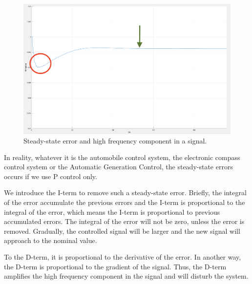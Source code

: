\begin{figure}[t]
\center
\includegraphics[scale=0.3]{figure/3_2_steady.png}
\caption{Steady-state error and high frequency component in a signal.}
\label{3_2_steady}
\end{figure}

In reality, whatever it is the automobile control system, the electronic compass control system or the Automatic Generation Control, the steady-state errors occurs if we use P control only. 

We introduce the I-term to remove such a steady-state error. Briefly, the integral of the error accumulate the previous errors and the I-term is proportional to the integral of the error, which means the I-term is proportional to previous accumulated errors. The integral of the error will not be zero, unless the error is removed. Gradually, the controlled signal will be larger and the new signal will approach to the nominal value. 

To the D-term, it is proportional to the derivative of the error. In another way, the D-term is proportional to the gradient of the signal. Thus, the D-term amplifies the high frequency component in the signal and will disturb the system. 